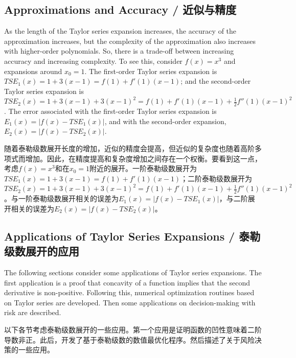 \subsection{Approximations and Accuracy / 近似与精度}

\begin{original}
As the length of the Taylor series expansion increases, the accuracy of the approximation increases, but the complexity of the approximation also increases with higher-order polynomials. So, there is a trade-off between increasing accuracy and increasing complexity. To see this, consider $f(x) = x^3$ and expansions around $x_0 = 1$. The first-order Taylor series expansion is $TSE_1(x) = 1 + 3(x - 1) = f(1) + f'(1)(x - 1)$; and the second-order Taylor series expansion is $TSE_2(x) = 1 + 3(x - 1) + 3(x - 1)^2 = f(1) + f'(1)(x - 1) + \frac{1}{2}f''(1)(x - 1)^2$. The error associated with the first-order Taylor series expansion is $E_1(x) = |f(x) - TSE_1(x)|$, and with the second-order expansion, $E_2(x) = |f(x) - TSE_2(x)|$.
\end{original}
\begin{translation}
随着泰勒级数展开长度的增加，近似的精度会提高，但近似的复杂度也随着高阶多项式而增加。因此，在精度提高和复杂度增加之间存在一个权衡。要看到这一点，考虑$f(x) = x^3$和在$x_0 = 1$附近的展开。一阶泰勒级数展开为$TSE_1(x) = 1 + 3(x - 1) = f(1) + f'(1)(x - 1)$；二阶泰勒级数展开为$TSE_2(x) = 1 + 3(x - 1) + 3(x - 1)^2 = f(1) + f'(1)(x - 1) + \frac{1}{2}f''(1)(x - 1)^2$。与一阶泰勒级数展开相关的误差为$E_1(x) = |f(x) - TSE_1(x)|$，与二阶展开相关的误差为$E_2(x) = |f(x) - TSE_2(x)|$。
\end{translation}
\subsection{Applications of Taylor Series Expansions / 泰勒级数展开的应用}

\begin{original}
The following sections consider some applications of Taylor series expansions. The first application is a proof that concavity of a function implies that the second derivative is non-positive. Following this, numerical optimization routines based on Taylor series are developed. Then some applications on decision-making with risk are described.
\end{original}
\begin{translation}
以下各节考虑泰勒级数展开的一些应用。第一个应用是证明函数的凹性意味着二阶导数非正。此后，开发了基于泰勒级数的数值最优化程序。然后描述了关于风险决策的一些应用。
\end{translation}

